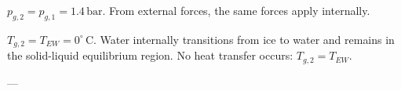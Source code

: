 \( p_{g,2} = p_{g,1} = 1.4 \, \text{bar} \).  
From external forces, the same forces apply internally.  

\( T_{g,2} = T_{EW} = 0^\circ \, \text{C} \).  
Water internally transitions from ice to water and remains in the solid-liquid equilibrium region.  
No heat transfer occurs: \( T_{g,2} = T_{EW} \).  

---